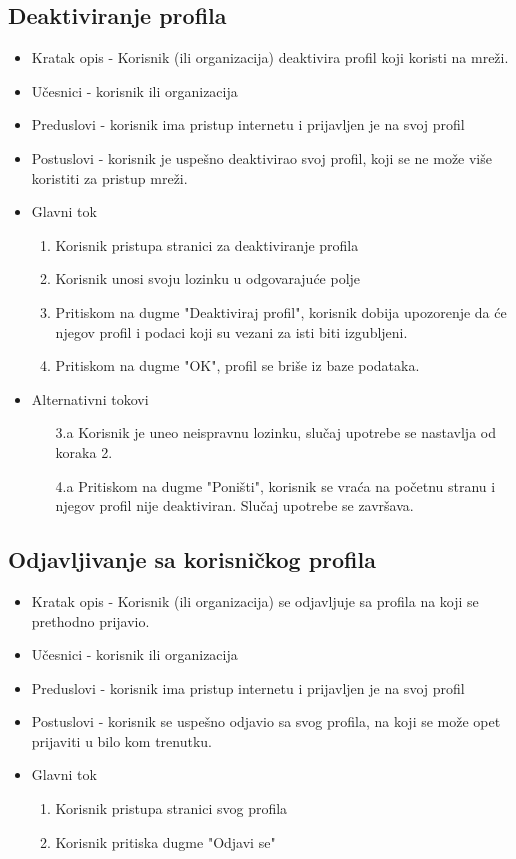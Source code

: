 \subsection{Deaktiviranje profila}
\begin{itemize}
	\item Kratak opis - Korisnik (ili organizacija) deaktivira profil koji koristi na mreži.
	\item Učesnici - korisnik ili organizacija
	\item Preduslovi - korisnik ima pristup internetu i prijavljen je na svoj profil
	\item Postuslovi - korisnik je uspešno deaktivirao svoj profil, koji se ne može više koristiti za pristup mreži.
	\item Glavni tok
		\begin{enumerate}
			\item Korisnik pristupa stranici za deaktiviranje profila
			\item Korisnik unosi svoju lozinku u odgovarajuće polje
			\item Pritiskom na dugme "Deaktiviraj profil", korisnik dobija upozorenje da će njegov profil i podaci koji su vezani za isti biti izgubljeni.
			\item Pritiskom na dugme "OK", profil se briše iz baze podataka.
		\end{enumerate}
	\item Alternativni tokovi
		\begin{itemize}
			\item[3.a] Korisnik je uneo neispravnu lozinku, slučaj upotrebe se nastavlja od koraka 2.
			\item[4.a] Pritiskom na dugme "Poništi", korisnik se vraća na početnu stranu i njegov profil nije deaktiviran. Slučaj upotrebe se završava.
		\end{itemize}
\end{itemize}

\subsection{Odjavljivanje sa korisničkog profila}
\begin{itemize}
	\item Kratak opis - Korisnik (ili organizacija) se odjavljuje sa profila na koji se prethodno prijavio.
	\item Učesnici - korisnik ili organizacija
	\item Preduslovi - korisnik ima pristup internetu i prijavljen je na svoj profil
	\item Postuslovi - korisnik se uspešno odjavio sa svog profila, na koji se može opet prijaviti u bilo kom trenutku.
	\item Glavni tok
		\begin{enumerate}
			\item Korisnik pristupa stranici svog profila
			\item Korisnik pritiska dugme "Odjavi se"
		\end{enumerate}
\end{itemize}
